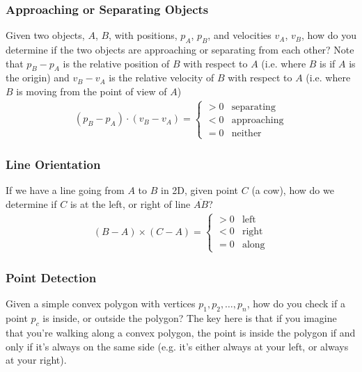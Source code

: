 \documentclass[12pt]{report}
\begin{document}
\subsubsection{Approaching or Separating Objects}
Given two objects, $A$, $B$, with positions, $p_A$, $p_B$, and velocities $v_A$, $v_B$, how do you determine if the two objects are approaching or separating from each other?
Note that $p_B - p_A$ is the relative position of $B$ with respect to $A$ (i.e. where $B$ is if $A$ is the origin) and $v_B - v_A$ is the relative velocity of $B$ with respect to $A$ (i.e. where $B$ is moving from the point of view of $A$)
\begin{align}
	(p_B - p_A) \cdot (v_B - v_A) = 
	\begin{cases}
	> 0 & \text{separating}  \\
	< 0 & \text{approaching} \\
	= 0 & \text{neither}     
	\end{cases}
\end{align}
		
\subsubsection{Line Orientation}
		
If we have a line going from $A$ to $B$ in 2D, given point $C$ (a cow), how do we determine if $C$ is at the left, or right of line $\overline{AB}$?
\begin{align}
	(B - A) \times (C - A) = \begin{cases}
	> 0 & \text{left}  \\
	< 0 & \text{right} \\
	= 0 & \text{along} 
	\end{cases}
\end{align}
\subsubsection{Point Detection}
Given a simple convex polygon with vertices $p_1, p_2, \dots, p_n$, how do you check if a point $p_c$ is inside, or outside the polygon? The key here is that if you imagine that you're walking along a convex polygon, the point is inside the polygon if and only if it's always on the same side (e.g. it's either always at your left, or always at your right).
		
\end{document}
